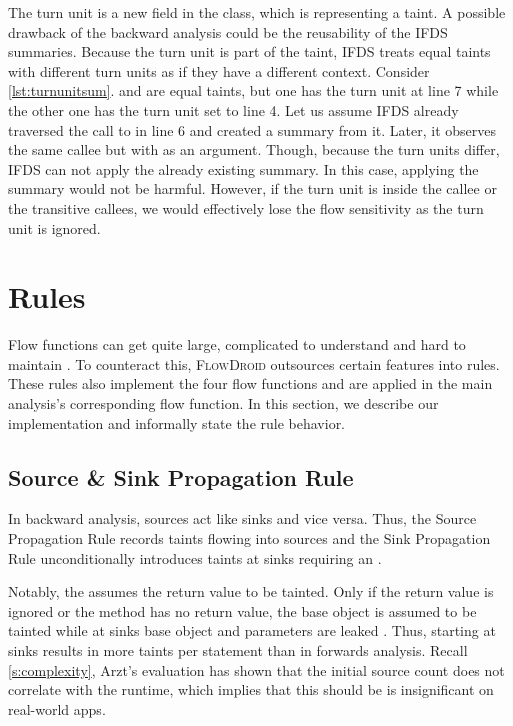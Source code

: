 \documentclass[../draft.tex]{subfiles}
\begin{document}
    The turn unit is a new field in the  class, which is representing a taint. A possible drawback of the backward analysis could be the reusability of the IFDS summaries. Because the turn unit is part of the taint, IFDS treats equal taints with different turn units as if they have a different context. Consider \autoref{lst:turnunitsum}.  and  are equal taints, but one has the turn unit at line 7 while the other one has the turn unit set to line 4. Let us assume IFDS already traversed the call to  in line 6 and created a summary from it. Later, it observes the same callee but with  as an argument. Though, because the turn units differ, IFDS can not apply the already existing summary. In this case, applying the summary would not be harmful. However, if the turn unit is inside the callee or the transitive callees, we would effectively lose the flow sensitivity as the turn unit is ignored.

    \section{Rules}\label{s:rules}
    Flow functions can get quite large, complicated to understand and hard to maintain \cite{Lerch2015}. To counteract this, \textsc{FlowDroid} outsources certain features into rules. These rules also implement the four flow functions and are applied in the main analysis's corresponding flow function.
    In this section, we describe our implementation and informally state the rule behavior.

    \subsection{Source \& Sink Propagation Rule}\label{s:sourcerule}
    In backward analysis, sources act like sinks and vice versa. Thus, the Source Propagation Rule records taints flowing into sources and the Sink Propagation Rule unconditionally introduces taints at sinks requiring an .

    Notably, the  assumes the return value to be tainted. Only if the return value is ignored or the method has no return value, the base object is assumed to be tainted while at sinks base object and parameters are leaked \cite{Arzt2017PhD}. Thus, starting at sinks results in more taints per statement than in forwards analysis. Recall \autoref{s:complexity}, Arzt's evaluation has shown that the initial source count does not correlate with the runtime, which implies that this should be is insignificant on real-world apps.
\end{document}
